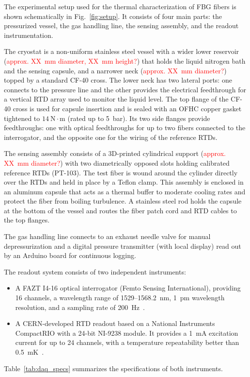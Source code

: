 \documentclass[12pt]{article}
\begin{document}
The experimental setup used for the thermal characterization of FBG fibers is shown schematically in Fig.~\ref{fig:setup}. It consists of four main parts: the pressurized vessel, the gas handling line, the sensing assembly, and the readout instrumentation.

The cryostat is a non-uniform stainless steel vessel with a wider lower reservoir (\textcolor{red}{approx. XX~mm diameter, XX~mm height?}) that holds the liquid nitrogen bath and the sensing capsule, and a narrower neck (\textcolor{red}{approx. XX~mm diameter?}) topped by a standard CF-40 cross. The lower neck has two lateral ports: one connects to the pressure line and the other provides the electrical feedthrough for a vertical RTD array used to monitor the liquid level. The top flange of the CF-40 cross is used for capsule insertion and is sealed with an OFHC copper gasket tightened to $14~\text{N}\cdot\text{m}$ (rated up to 5~bar). Its two side flanges provide feedthroughs: one with optical feedthroughs for up to two fibers connected to the interrogator, and the opposite one for the wiring of the reference RTDs.

The sensing assembly consists of a 3D-printed cylindrical support (\textcolor{red}{approx. XX~mm diameter?}) with two diametrically opposed slots holding calibrated reference RTDs (PT-103). The test fiber is wound around the cylinder directly over the RTDs and held in place by a Teflon clamp. This assembly is enclosed in an aluminum capsule that acts as a thermal buffer to moderate cooling rates and protect the fiber from boiling turbulence. A stainless steel rod holds the capsule at the bottom of the vessel and routes the fiber patch cord and RTD cables to the top flanges.

The gas handling line connects to an exhaust needle valve for manual depressurization and a digital pressure transmitter (with local display) read out by an Arduino board for continuous logging.

The readout system consists of two independent instruments:
\begin{itemize}
    \item A FAZT I4-16 optical interrogator (Femto Sensing International), providing 16 channels, a wavelength range of 1529--1568.2~nm, 1~pm wavelength resolution, and a sampling rate of 200~Hz~\cite{FemtoSenseManual}.
    \item A CERN-developed RTD readout based on a National Instruments CompactRIO with a 24-bit NI-9238 module. It provides a 1~mA excitation current for up to 24 channels, with a temperature repeatability better than 0.5~mK~\cite{RTDs_paper}.
\end{itemize}
Table~\ref{tab:daq_specs} summarizes the specifications of both instruments.
\end{document}
